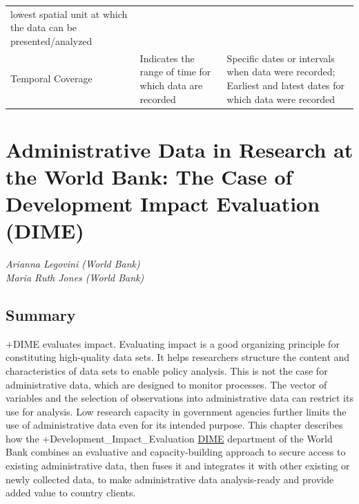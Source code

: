 \documentclass[
]{book}
\begin{document}
\begin{longtable}[]{@{}lll@{}}
\begin{minipage}[t]{0.35\columnwidth}
lowest spatial unit at
which the data can be
presented/analyzed\strut
\end{minipage}\tabularnewline
\begin{minipage}[t]{0.22\columnwidth}\raggedright
Temporal
Coverage\strut
\end{minipage} & \begin{minipage}[t]{0.35\columnwidth}\raggedright
Indicates the range of
time for which data are
recorded\strut
\end{minipage} & \begin{minipage}[t]{0.35\columnwidth}\raggedright
Specific dates or
intervals when data were
recorded; Earliest and
latest dates for which
data were recorded\strut
\end{minipage}\tabularnewline
\bottomrule
\end{longtable}

\hypertarget{dime}{%
\chapter{Administrative Data in Research at the World Bank: The Case of Development Impact Evaluation (DIME)}\label{dime}}

\emph{Arianna Legovini (World Bank)}\\
\emph{Maria Ruth Jones (World Bank)}

\hypertarget{summary-8}{%
\section{Summary}\label{summary-8}}

+DIME\textbar{} evaluates impact. Evaluating impact is a good organizing principle for constituting high-quality data sets. It helps researchers structure the content and characteristics of data sets to enable policy analysis. This is not the case for administrative data, which are designed to monitor processes. The vector of variables and the selection of observations into administrative data can restrict its use for analysis. Low research capacity in government agencies further limits the use of administrative data even for its intended purpose. This chapter describes how the +Development\_Impact\_Evaluation\textbar{} \href{https://www.worldbank.org/en/research/dime}{DIME} department of the World Bank combines an evaluative and capacity-building approach to secure access to existing administrative data, then fuses it and integrates it with other existing or newly collected data, to make administrative data analysis-ready and provide added value to country clients.
\end{document}
